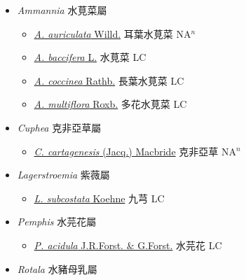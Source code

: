 
  \begin{itemize}
 \item[] \textit{Ammannia} 水莧菜屬
                    
  \begin{itemize}
        \item[] \href{http://www.theplantlist.org/tpl1.1/search?q=Ammannia+auriculata}{\textit{A. auriculata} Willd.}   耳葉水莧菜 NA$^n$
        \item[] \href{http://www.theplantlist.org/tpl1.1/search?q=Ammannia+baccifera}{\textit{A. baccifera} L.}   水莧菜 LC
        \item[] \href{http://www.theplantlist.org/tpl1.1/search?q=Ammannia+coccinea}{\textit{A. coccinea} Rathb.}   長葉水莧菜 LC
        \item[] \href{http://www.theplantlist.org/tpl1.1/search?q=Ammannia+multiflora}{\textit{A. multiflora} Roxb.}   多花水莧菜 LC
  \end{itemize}
 \item[] \textit{Cuphea} 克非亞草屬
                    
  \begin{itemize}
        \item[] \href{http://www.theplantlist.org/tpl1.1/search?q=Cuphea+cartagenesis}{\textit{C. cartagenesis} (Jacq.) Macbride}   克非亞草 NA$^n$
  \end{itemize}
 \item[] \textit{Lagerstroemia} 紫薇屬
                    
  \begin{itemize}
        \item[] \href{http://www.theplantlist.org/tpl1.1/search?q=Lagerstroemia+subcostata}{\textit{L. subcostata} Koehne}   九芎 LC
  \end{itemize}
 \item[] \textit{Pemphis} 水芫花屬
                    
  \begin{itemize}
        \item[] \href{http://www.theplantlist.org/tpl1.1/search?q=Pemphis+acidula}{\textit{P. acidula} J.R.Forst. \& G.Forst.}   水芫花 LC
  \end{itemize}
 \item[] \textit{Rotala} 水豬母乳屬
                    

\end{itemize}
